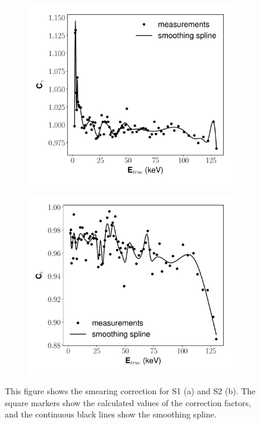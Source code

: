 \begin{figure}[h!]
\centering
\begin{subfigure}{0.5\textwidth}
  \centering
  \includegraphics[width=\textwidth]{Figures/yields_corrections/C14_LN_correction_gfdcm_180Vcm_prelim.pdf}
  \caption{}
\end{subfigure}%
\begin{subfigure}{0.5\textwidth}
  \centering
  \includegraphics[width=\textwidth]{Figures/yields_corrections/C14_QN_correction_gfdcm_180Vcm_prelim.pdf}
\end{subfigure}
\caption{This figure shows the smearing correction for S1 (a) and S2 (b). The square markers show the calculated values of the correction factors, and the continuous black lines show the smoothing spline.}
\label{fig:lnqn_correction}
\end{figure}

